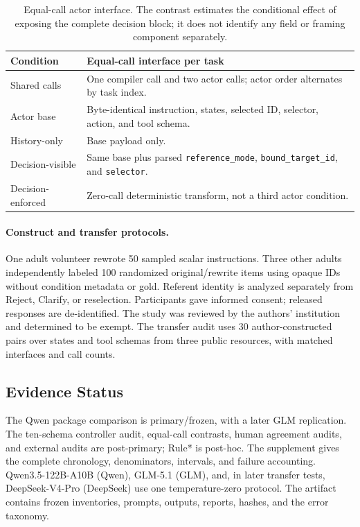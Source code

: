 \documentclass[letterpaper]{article}
\begin{document}
\begin{table}[t]
\centering
\footnotesize
\setlength{\tabcolsep}{3pt}
\begin{tabular}{@{}p{}p{}@{}}
\toprule
Condition & Equal-call interface per task \\
\midrule
Shared calls & One compiler call and two actor calls; actor order alternates by task index. \\
Actor base & Byte-identical instruction, states, selected ID, selector, action, and tool schema. \\
History-only & Base payload only. \\
Decision-visible & Same base plus parsed \texttt{reference\_mode}, \texttt{bound\_target\_id}, and \texttt{selector}. \\
Decision-enforced & Zero-call deterministic transform, not a third actor condition. \\
\bottomrule
\end{tabular}
\caption{Equal-call actor interface. The contrast estimates the conditional effect of exposing the
complete decision block; it does not identify any field or framing component separately.}
\label{tab:equal-call-interface}
\end{table}

\paragraph{Construct and transfer protocols.}
One adult volunteer rewrote 50 sampled scalar instructions. Three other adults independently
labeled 100 randomized original/rewrite items using opaque IDs without condition metadata or gold.
Referent identity is analyzed separately from Reject, Clarify, or reselection. Participants gave
informed consent; released responses are de-identified. The study was reviewed by the authors'
institution and determined to be exempt. The transfer audit uses 30 author-constructed pairs over states and tool
schemas from three public resources, with matched interfaces and call counts.

\subsection{Evidence Status}
The Qwen package comparison is primary/frozen, with a later GLM replication. The ten-schema
controller audit, equal-call contrasts, human agreement audits, and external audits are post-primary;
Rule* is post-hoc. The supplement gives the complete chronology, denominators, intervals, and
failure accounting. Qwen3.5-122B-A10B (Qwen), GLM-5.1 (GLM), and, in later transfer tests,
DeepSeek-V4-Pro (DeepSeek) use one temperature-zero protocol. The artifact contains frozen
inventories, prompts, outputs, reports, hashes, and the error taxonomy.
\end{document}
